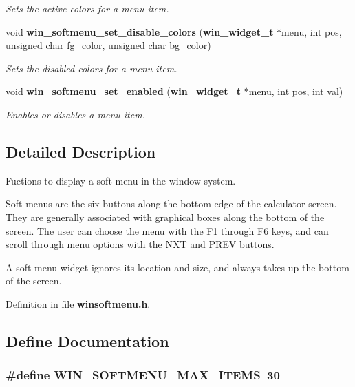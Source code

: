 \begin{CompactItemize}
\begin{CompactList}\small\item\em Sets the active colors for a menu item. \item\end{CompactList}\item 
void {\bf win\_\-softmenu\_\-set\_\-disable\_\-colors} ({\bf win\_\-widget\_\-t} $\ast$menu, int pos, unsigned char fg\_\-color, unsigned char bg\_\-color)\label{winsoftmenu_8h_a7}

\begin{CompactList}\small\item\em Sets the disabled colors for a menu item. \item\end{CompactList}\item 
void {\bf win\_\-softmenu\_\-set\_\-enabled} ({\bf win\_\-widget\_\-t} $\ast$menu, int pos, int val)\label{winsoftmenu_8h_a8}

\begin{CompactList}\small\item\em Enables or disables a menu item. \item\end{CompactList}\end{CompactItemize}


\subsection{Detailed Description}
Fuctions to display a soft menu in the window system. 

Soft menus are the six buttons along the bottom edge of the calculator screen. They are generally associated with graphical boxes along the bottom of the screen. The user can choose the menu with the F1 through F6 keys, and can scroll through menu options with the NXT and PREV buttons.

A soft menu widget ignores its location and size, and always takes up the bottom of the screen. 

Definition in file {\bf winsoftmenu.h}.

\subsection{Define Documentation}
\subsubsection{\setlength{\rightskip}{0pt plus 5cm}\#define WIN\_\-SOFTMENU\_\-MAX\_\-ITEMS~30}\label{winsoftmenu_8h_a0}


